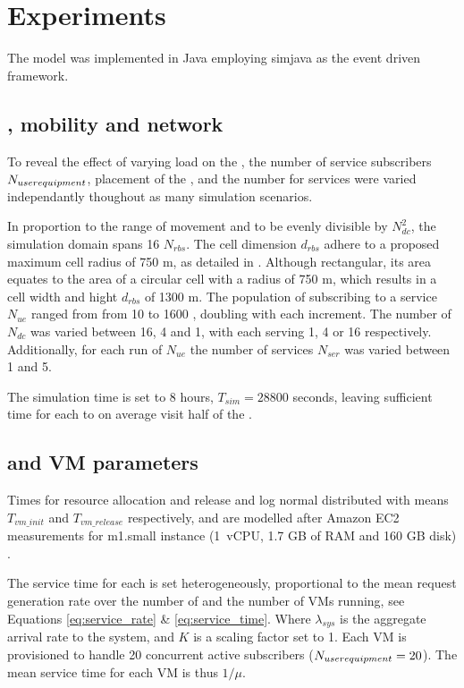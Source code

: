 \section{Experiments}
\label{sec:experiments}
The \xcloud model was implemented in Java employing simjava \cite{SimJava} as the event driven framework.

\subsection{\Ue, mobility and network}
To reveal the effect of varying load on the \dcs{}, the number of \ue{} service subscribers $N_{user equipment}$, placement of the \dcs{}, and the number for services were varied independantly thoughout as many simulation scenarios. 

In proportion to the range of movement and to be evenly divisible by $N_{dc}^2$, the simulation domain spans 16 \rbss{} $N_{rbs}$. The cell dimension $d_{rbs}$ adhere to a proposed maximum cell radius of 750 m, as detailed in \cite{shahab2013framework}. Although rectangular, its area equates to the area of a circular cell with a radius of 750 m, which results in a cell width and hight $d_{rbs}$ of 1300 m. The population of \ues{} subscribing to a service $N_{ue}$ ranged from from 10 to 1600 \ues{}, doubling with each increment. The number of \dcs{} $N_{dc}$ was varied between 16, 4 and 1, with each \dc{} serving 1, 4 or 16 \rbss{} respectively. Additionally, for each run of $N_{ue}$ the number of services $N_{ser}$ was varied between 1 and 5.

The simulation time is set to 8 hours, $T_{sim}=28800$ seconds, leaving sufficient time for each \ue{} to on average visit half of the \rbss{}.

\subsection{\Dc{} and VM parameters}
Times for resource allocation and release and log normal distributed with means $T_{vm\_init}$ and $T_{vm\_release}$ respectively, and are modelled after Amazon EC2 measurements for m1.small instance (1~vCPU, 1.7 GB of RAM and 160 GB disk) \cite{5719609}. %

The service time for each \dc{} is set heterogeneously, proportional to the mean request generation rate over the number of \rbss{} and the number of VMs running, see Equations \ref{eq:service_rate} \& \ref{eq:service_time}. Where $\lambda_{sys}$ is the aggregate arrival rate to the system, and $K$ is a scaling factor set to 1. Each VM is provisioned to handle 20 concurrent active subscribers ($N_{user equipment} = 20$). The mean service time for each VM is thus $1/\mu$.

